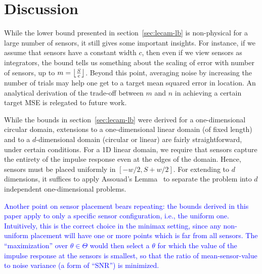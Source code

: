 \documentclass[conference]{IEEEtran}
\providecommand{\v}{}
\renewcommand{\v}[1]{\underline{#1}}
\providecommand{\vhat}{}
\renewcommand{\vhat}[1]{\underline{\hat{#1}}}
\DeclarePairedDelimiter\norm{\lVert}{\rVert}
\DeclarePairedDelimiter\floor{\lfloor}{\rfloor}
\newcommand{\Phiorho}{\Phi\!\circ\!\rho}
\begin{document}


\section{Discussion}
\label{sec:discussion}

While the lower bound presented in section~\ref{sec:lecam-lb} is non-physical
for a large number of sensors, it still gives some important insights. For
instance, if we assume that sensors have a constant width $c$, then even if we
view sensors as integrators, the bound tells us something about the scaling of
error with number of sensors, up to $m = \floor*{\frac{S}{c}}$. Beyond this
point, averaging noise by increasing the number of trials may help one get to a
target mean squared error in location. An analytical derivation of the
trade-off between $m$ and $n$ in achieving a certain target MSE is relegated to
future work.

While the bounds in section~\ref{sec:lecam-lb} were derived for a
one-dimensional circular domain, extensions to a one-dimensional linear domain
(of fixed length) and to a $d$-dimensional domain (circular or linear) are
fairly straightforward, under certain conditions. For a 1D linear domain, we
require that sensors capture the entirety of the impulse response even at the
edges of the domain. Hence, sensors must be placed uniformly in $[-w/2,
S{+}w/2]$. For extending to $d$ dimensions, it suffices to apply Assouad's
Lemma~\cite{Tsybakov2009Introduction} to separate the problem into $d$
independent one-dimensional problems.

\textcolor{blue}{
Another point on sensor placement bears repeating: the bounds derived in this
paper apply to only a specific sensor configuration, i.e., the uniform one.
Intuitively, this is the correct choice in the minimax setting, since any
non-uniform placement will have one or more points which is far from all
sensors. The ``maximization'' over $\theta \in \Theta$ would then select a
$\theta$ for which the value of the impulse response at the sensors is
smallest, so that the ratio of mean-sensor-value to noise variance (a form of
``SNR'') is minimized.
}
\end{document}
